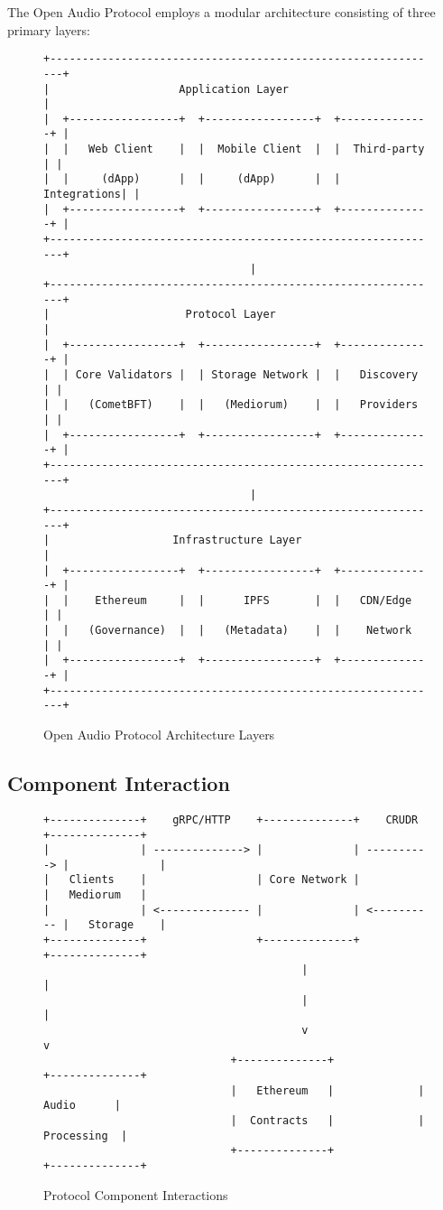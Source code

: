\documentclass[11pt,a4paper]{article}
\begin{document}
The Open Audio Protocol employs a modular architecture consisting of three primary layers:

\begin{figure}[H]
  \centering
\begin{verbatim}
+-------------------------------------------------------------+
|                    Application Layer                        |
|  +-----------------+  +-----------------+  +--------------+ |
|  |   Web Client    |  |  Mobile Client  |  |  Third-party | |
|  |     (dApp)      |  |     (dApp)      |  |  Integrations| |
|  +-----------------+  +-----------------+  +--------------+ |
+-------------------------------------------------------------+
                                |
+-------------------------------------------------------------+
|                     Protocol Layer                          |
|  +-----------------+  +-----------------+  +--------------+ |
|  | Core Validators |  | Storage Network |  |   Discovery  | |
|  |   (CometBFT)    |  |   (Mediorum)    |  |   Providers  | |
|  +-----------------+  +-----------------+  +--------------+ |
+-------------------------------------------------------------+
                                |
+-------------------------------------------------------------+
|                   Infrastructure Layer                      |
|  +-----------------+  +-----------------+  +--------------+ |
|  |    Ethereum     |  |      IPFS       |  |   CDN/Edge   | |
|  |   (Governance)  |  |   (Metadata)    |  |    Network   | |
|  +-----------------+  +-----------------+  +--------------+ |
+-------------------------------------------------------------+
\end{verbatim}
  \caption{Open Audio Protocol Architecture Layers}
\end{figure}

\subsection{Component Interaction}

\begin{figure}[H]
  \centering
\begin{verbatim}
+--------------+    gRPC/HTTP    +--------------+    CRUDR     +--------------+
|              | --------------> |              | ----------> |              |
|   Clients    |                 | Core Network |             |   Mediorum   |
|              | <-------------- |              | <---------- |   Storage    |
+--------------+                 +--------------+             +--------------+
                                        |                             |
                                        |                             |
                                        v                             v
                             +--------------+             +--------------+
                             |   Ethereum   |             |   Audio      |
                             |  Contracts   |             |  Processing  |
                             +--------------+             +--------------+
\end{verbatim}
  \caption{Protocol Component Interactions}
\end{figure}
\end{document}
